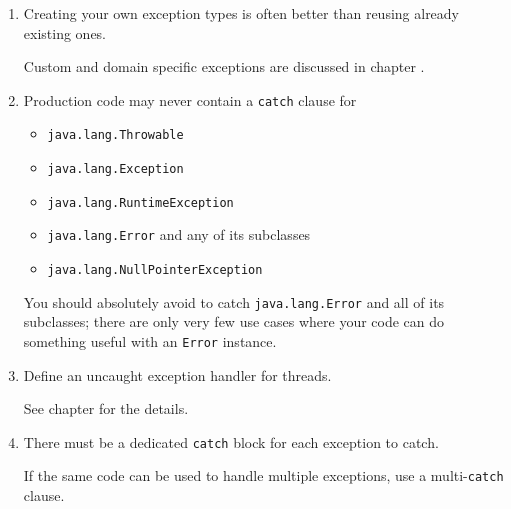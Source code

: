 \begin{enumerate}[label=P\arabic*.]
{	Usually, it is not necessary to declare a validation exception, because every method that has parameters may throw them.
	
	Declaring (and documenting) the exceptions allows the caller of a method to respond specifically to individual exceptions.}
	
	\item{Creating your own exception types is often better than reusing already existing ones.
	
	Custom and domain specific exceptions are discussed in chapter .}
	
	\item{Production code may never contain a \lstinline|catch| clause for 
		\begin{itemize}[nosep]
			\item{\lstinline|java.lang.Throwable|}
			\item{\lstinline|java.lang.Exception|}
			\item{\lstinline|java.lang.RuntimeException|}
			\item{\lstinline|java.lang.Error| and any of its subclasses}
			\item{\lstinline|java.lang.NullPointerException|}
		\end{itemize}
		You should absolutely avoid to catch \lstinline|java.lang.Error| and all of its subclasses; there are only very few use cases where your code can do something useful with an \lstinline|Error| instance.}
		
	\item{Define an uncaught exception handler for threads.
	
	See chapter 	for the details.}
	
	\item{There must be a dedicated \lstinline|catch| block for each exception to catch.
	
	If the same code can be used to handle multiple exceptions, use a multi-\lstinline|catch| clause.}
	

\end{enumerate}
